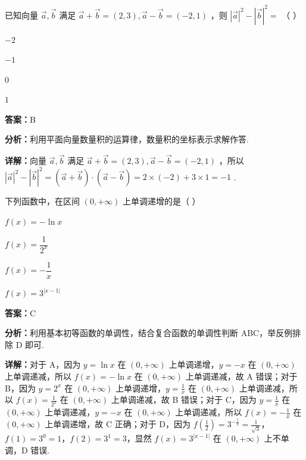 \begin{question}[points=4]
已知向量 $\vec{a}, \vec{b}$ 满足 $\vec{a} + \vec{b} = (2,3), \vec{a} - \vec{b} = (-2,1)$ ，则 $|\vec{a}|^2 - |\vec{b}|^2 =$ （ ）
\begin{choices}
  \item $-2$
  \item $-1$
  \item $0$
  \item $1$
\end{choices}
\begin{solution}
\textbf{答案：}B

\textbf{分析：}利用平面向量数量积的运算律，数量积的坐标表示求解作答.

\textbf{详解：}向量 $\vec{a}, \vec{b}$ 满足 $\vec{a} + \vec{b} = (2,3), \vec{a} - \vec{b} = (-2,1)$ ，所以 $|\vec{a}|^2 - |\vec{b}|^2 = (\vec{a}+\vec{b})\cdot(\vec{a}-\vec{b}) = 2\times(-2) + 3\times1 = -1$ .
\end{solution}
\end{question}

\begin{question}[points=4]
下列函数中，在区间 $(0, +\infty)$ 上单调递增的是（ ）
\begin{choices}
  \item $f(x) = -\ln x$
  \item $f(x) = \dfrac{1}{2^x}$
  \item $f(x) = -\dfrac{1}{x}$
  \item $f(x) = 3^{|x-1|}$
\end{choices}
\begin{solution}
\textbf{答案：}C

\textbf{分析：}利用基本初等函数的单调性，结合复合函数的单调性判断 ABC，举反例排除 D 即可.

\textbf{详解：}对于 A，因为 $y=\ln x$ 在 $(0,+\infty)$ 上单调递增，$y=-x$ 在 $(0,+\infty)$ 上单调递减，所以 $f(x)=-\ln x$ 在 $(0,+\infty)$ 上单调递减，故 A 错误；对于 B，因为 $y=2^x$ 在 $(0,+\infty)$ 上单调递增，$y=\frac{1}{x}$ 在 $(0,+\infty)$ 上单调递减，所以 $f(x)=\frac{1}{2^x}$ 在 $(0,+\infty)$ 上单调递减，故 B 错误；对于 C，因为 $y=\frac{1}{x}$ 在 $(0,+\infty)$ 上单调递减，$y=-x$ 在 $(0,+\infty)$ 上单调递减，所以 $f(x)=-\frac{1}{x}$ 在 $(0,+\infty)$ 上单调递增，故 C 正确；对于 D，因为 $f(\frac{1}{2})=3^{-\frac{1}{2}}=\frac{1}{\sqrt{3}}$，$f(1)=3^0=1$，$f(2)=3^1=3$，显然 $f(x)=3^{|x-1|}$ 在 $(0,+\infty)$ 上不单调，D 错误.
\end{solution}
\end{question}

